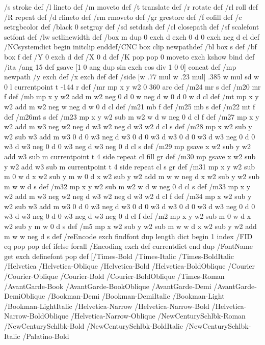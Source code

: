 /s {stroke} def /l {lineto} def /m {moveto} def /t {translate} def
/r {rotate} def /rl {roll}  def /R {repeat} def
/d {rlineto} def /rm {rmoveto} def /gr {grestore} def /f {eofill} def
/c {setrgbcolor} def /black {0 setgray} def /sd {setdash} def
/cl {closepath} def /sf {scalefont setfont} def /lw {setlinewidth} def
/box {m dup 0 exch d exch 0 d 0 exch neg d cl} def
/NC{systemdict begin initclip end}def/C{NC box clip newpath}def
/bl {box s} def /bf {box f} def /Y { 0 exch d} def /X { 0 d} def 
/K {{pop pop 0 moveto} exch kshow} bind def
/ita {/ang 15 def gsave [1 0 ang dup sin exch cos div 1 0 0] concat} def 
/mp {newpath /y exch def /x exch def} def
/side {[w .77 mul w .23 mul] .385 w mul sd w 0 l currentpoint t -144 r} def
/mr {mp x y w2 0 360 arc} def /m24 {mr s} def /m20 {mr f} def
/mb {mp x y w2 add m w2 neg 0 d 0 w neg d w 0 d 0 w d cl} def
/mt {mp x y w2 add m w2 neg w neg d w 0 d cl} def
/m21 {mb f} def /m25 {mb s} def /m22 {mt f} def /m26{mt s} def
/m23 {mp x y w2 sub m w2 w d w neg 0 d cl f} def
/m27 {mp x y w2 add m w3 neg w2 neg d w3 w2 neg d w3 w2 d cl s} def
/m28 {mp x w2 sub y w2 sub w3 add m w3 0 d  0 w3 neg d w3 0 d 0 w3 d w3 0 d  0 w3 d w3 neg 0 d 0 w3 d w3 neg 0 d 0 w3 neg d w3 neg 0 d cl s } def
/m29 {mp gsave x w2 sub y w2 add w3 sub m currentpoint t 4 {side} repeat cl fill gr} def
/m30 {mp gsave x w2 sub y w2 add w3 sub m currentpoint t 4 {side} repeat cl s gr} def
/m31 {mp x y w2 sub m 0 w d x w2 sub y m w 0 d x w2 sub y w2 add m w w neg d x w2 sub y w2 sub m w w d s} def
/m32 {mp x y w2 sub m w2 w d w neg 0 d cl s} def
/m33 {mp x y w2 add m w3 neg w2 neg d w3 w2 neg d w3 w2 d cl f} def
/m34 {mp x w2 sub y w2 sub w3 add m w3 0 d  0 w3 neg d w3 0 d 0 w3 d w3 0 d  0 w3 d w3 neg 0 d 0 w3 d w3 neg 0 d 0 w3 neg d w3 neg 0 d cl f } def
/m2 {mp x y w2 sub m 0 w d x w2 sub y m w 0 d s} def
/m5 {mp x w2 sub y w2 sub m w w d x w2 sub y w2 add m w w neg d s} def
/reEncode {exch findfont dup length dict begin {1 index /FID eq  {pop pop} {def} ifelse } forall /Encoding exch def currentdict end dup /FontName get exch definefont pop } def [/Times-Bold /Times-Italic /Times-BoldItalic /Helvetica /Helvetica-Oblique
 /Helvetica-Bold /Helvetica-BoldOblique /Courier /Courier-Oblique /Courier-Bold /Courier-BoldOblique /Times-Roman /AvantGarde-Book /AvantGarde-BookOblique /AvantGarde-Demi /AvantGarde-DemiOblique /Bookman-Demi /Bookman-DemiItalic /Bookman-Light
 /Bookman-LightItalic /Helvetica-Narrow /Helvetica-Narrow-Bold /Helvetica-Narrow-BoldOblique /Helvetica-Narrow-Oblique /NewCenturySchlbk-Roman /NewCenturySchlbk-Bold /NewCenturySchlbk-BoldItalic /NewCenturySchlbk-Italic /Palatino-Bold
